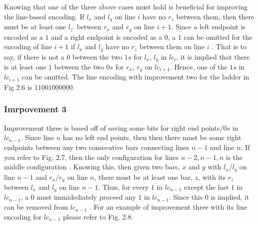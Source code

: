 Knowing that one of the three above cases must hold is beneficial for improving the 
line-based encoding. If $l_{x}$ and $l_{y}$ on line $i$ have no $r_{z}$ between them, 
then there must be at least one $l_{z\prime}$ between $r_{x}$ and $r_{y}$ on line $i+1$.
Since a left endpoint is encoded as a $1$ and a right endpoint is encoded as a $0$, 
a $1$ can be omitted for the encoding of line $i+1$ if $l_{x}$ and $l_{y}$ have no $r_{z}$
between them on line $i$ \cite{A5}. That is to say, if there is not a $0$ between 
the two  $1s$ for $l_{x}$, $l_{y}$ in $lc_{i}$, it is implied that there is at least one $1$ between 
the two $0s$ for $r_{x}$, $r_{y}$ on $lc_{i+1}$. Hence, one of the $1s$ in $lc_{i+1}$ can be omitted. 
The line encoding with improvement two for the ladder in Fig 2.6 is $11\underline{0}010\underline{0}00\underline{0}0$.
\subsubsection{Imrpovement 3}
Improvement three is based off of saving some bits for right 
end points/$0s$ in $lc_{n-1}$. Since line $n$ has no left end points,
then then there must be some right endpoints between any two 
consecutive bars connecting lines $n-1$ and line $n$. If you 
refer to Fig. 2.7, then the only configuration for lines $n-2, n-1, n$
is the middle configuration \cite{A5}. Knowing this, then 
given two bars, $x$ and $y$ with $l_{x}$/$l_{y}$ on line 
$n-1$ and $r_{x}$/$r_{y}$ on line $n$, there must be at least 
one bar, $z$, with its $r_{z}$ between $l_{x}$ and $l_{y}$
on line $n-1$. Thus, for every $1$ in $lc_{n-1}$ except the 
last $1$ in $lc_{n-1}$, a $0$ must immidediately proceed any $1$
in $lc_{n-1}$. Since this $0$ is implied, it can be removed from $lc_{n-1}$ \cite{A5}. 
For an example of improvement three with its line encoding for $lc_{n-1}$ please refer to Fig. 2.8.\pagebreak
